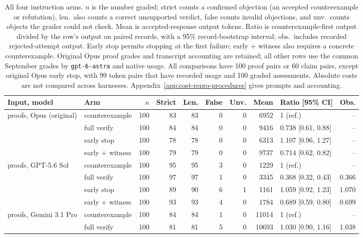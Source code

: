 \begin{table}[!htbp]
\centering
\scriptsize
\setlength{\tabcolsep}{3pt}
\caption{All four instruction arms. $n$ is the number graded; strict counts a confirmed objection (an accepted counterexample or refutation), len.\ also counts a correct unsupported verdict, false counts invalid objections, and unv.\ counts objects the grader could not check. Mean is accepted-response output tokens. Ratio is counterexample-first output divided by the row's output on paired records, with a 95\% record-bootstrap interval; obs.\ includes recorded rejected-attempt output. Early stop permits stopping at the first failure; early + witness also requires a concrete counterexample. Original Opus proof grades and transcript accounting are retained; all other rows use the common September grades by \texttt{gpt-6-astra} and native usage. All comparisons have 100 proof pairs or 60 claim pairs, except original Opus early stop, with 99 token pairs that have recorded usage and 100 graded assessments. Absolute costs are not compared across harnesses. Appendix~\ref{app:cost-repro-procedures} gives prompts and accounting.}
\label{tab:cost-repro}
\begin{tabular}{llrrrrrrlr}
\toprule
Input, model & Arm & $n$ & Strict & Len. & False & Unv. & Mean & Ratio [95\% CI] & Obs. \\
\midrule
proofs, Opus (original) & counterexample & 100 & 83 & 83 & 0 & 0 & 6952 & 1 (ref.) & -- \\
 & full verify & 100 & 84 & 84 & 0 & 0 & 9416 & 0.738 [0.61, 0.88] & -- \\
 & early stop & 100 & 78 & 78 & 0 & 0 & 6313 & 1.107 [0.96, 1.27] & -- \\
 & early + witness & 100 & 79 & 79 & 0 & 0 & 9737 & 0.714 [0.62, 0.82] & -- \\
\midrule
proofs, GPT-5.6 Sol & counterexample & 100 & 95 & 95 & 3 & 0 & 1229 & 1 (ref.) & -- \\
 & full verify & 100 & 97 & 97 & 1 & 0 & 3345 & 0.368 [0.32, 0.43] & 0.366 \\
 & early stop & 100 & 89 & 90 & 6 & 1 & 1161 & 1.059 [0.92, 1.23] & 1.070 \\
 & early + witness & 100 & 93 & 93 & 4 & 0 & 1784 & 0.689 [0.59, 0.80] & 0.699 \\
\midrule
proofs, Gemini 3.1 Pro & counterexample & 100 & 84 & 84 & 1 & 0 & 11014 & 1 (ref.) & -- \\
 & full verify & 100 & 81 & 81 & 5 & 0 & 10693 & 1.030 [0.90, 1.16] & 1.038 \\

\end{tabular}
\end{table}
